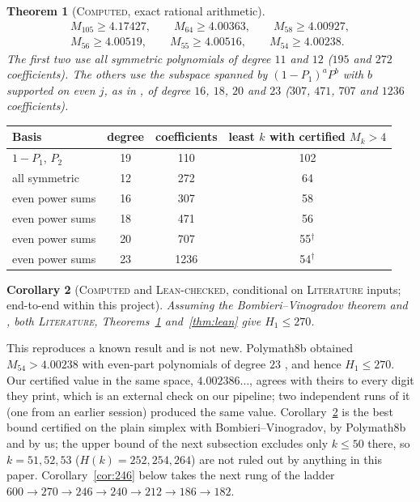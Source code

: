 \documentclass[11pt]{amsart}
\newtheorem{theorem}{Theorem}
\newtheorem{corollary}[theorem]{Corollary}
\theoremstyle{definition}
\theoremstyle{remark}
\newcommand{\lbl}[1]{\textup{\textsc{#1}}}
\begin{document}
\begin{theorem}[\lbl{Computed}, exact rational arithmetic]\label{thm:Mk}
\begin{gather*}
M_{105}\ge4.17427,\qquad M_{64}\ge4.00363,\qquad M_{58}\ge4.00927,\\
M_{56}\ge4.00519,\qquad M_{55}\ge4.00516,\qquad M_{54}\ge4.00238 .
\end{gather*}
The first two use all symmetric polynomials of degree $11$ and $12$
($195$ and $272$ coefficients). The others use the subspace spanned by
$(1-P_1)^aP^b$ with $b$ supported on even $j$, as in \cite[\S7]{Pol14b}, of
degree $16$, $18$, $20$ and $23$ ($307$, $471$, $707$ and $1236$ coefficients).
\end{theorem}

\begin{center}
\begin{tabular}{@{}lccc@{}}
\toprule
Basis & degree & coefficients & least $k$ with certified $M_k>4$\\
\midrule
$1-P_1$, $P_2$ & 19 & 110 & 102\\
all symmetric & 12 & 272 & 64\\
even power sums & 16 & 307 & 58\\
even power sums & 18 & 471 & 56\\
even power sums & 20 & 707 & 55$^{\dagger}$\\
even power sums & 23 & 1236 & 54$^{\dagger}$\\
\bottomrule
\end{tabular}
\end{center}

\begin{corollary}[\lbl{Computed} and \lbl{Lean-checked}, conditional on \lbl{Literature} inputs; end-to-end within this project]\label{cor:578}
Assuming the Bombieri--Vinogradov theorem and \cite[Prop.~4.2]{May15}, both
\lbl{Literature}, Theorems~\ref{thm:Mk} and~\ref{thm:lean} give
$H_1\le270$.
\end{corollary}

This reproduces a known result and is not new. Polymath8b obtained
$M_{54}>4.00238$ with even-part polynomials of degree $23$
\cite[Thm.~3.9]{Pol14b}, and hence $H_1\le270$. Our certified value in the
same space, $4.002386\ldots$, agrees with theirs to every digit they print,
which is an external check on our pipeline; two independent runs of it (one
from an earlier session) produced the same value. Corollary~\ref{cor:578}
is the best bound certified on the plain simplex with Bombieri--Vinogradov,
by Polymath8b and by us; the upper bound of the next subsection excludes only
$k\le50$ there, so $k=51,52,53$ ($H(k)=252,254,264$) are not ruled out by
anything in this paper. Corollary~\ref{cor:246} below takes the next rung of the
ladder $600\to270\to246\to240\to212\to186\to182$.
\end{document}
